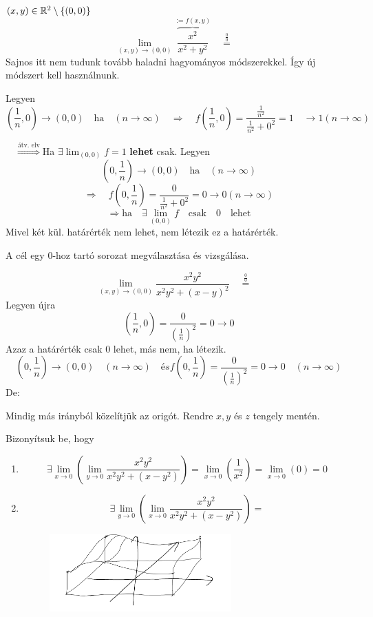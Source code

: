 \documentclass[a4paper,11.5pt]{article}
\begin{document}
	\begin{task}$(x,y)\in\mathbb{R}^2\setminus\{(0,0)\}$
		\[ \lim_{(x,y)\to(0,0)}\overbrace{\frac{x^2}{x^2+y^2}}^{:=f(x,y)}\quad \overset{\frac{0}{0}}{=}\quad  \]
		Sajnos itt nem tudunk tovább haladni hagyományos módszerekkel. Így új módszert kell használnunk.
		\smallskip
		
		Legyen \[\left(\frac{1}{n},0\right)\to(0,0)\quad \text{ha}\quad (n\to\infty)\quad \Rightarrow\quad f\left(\frac{1}{n},0\right)=\frac{\frac{1}{n^2}}{\frac{1}{n^2}+0^2}=1\quad \to1(n\to\infty)\]
		
		$\quad \overset{\text{átv. elv}}{\Rightarrow}$\quad Ha $\exists\lim_{(0,0)}f=1$ \textbf{lehet} csak.
		Legyen 
		\[ \left(0,\frac{1}{n}\right)\to(0,0)\quad \text{ha}\quad (n\to\infty) \]
		\[ \Rightarrow\quad f\left(0,\frac{1}{n}\right)=\frac{0}{\frac{1}{n^2}+0^2}=0\to 0(n\to\infty) \]
		\[ \Rightarrow \text{ha}\quad \exists\lim_{(0,0)}f\quad \text{csak}\quad 0 \quad \text{lehet} \]
		Mivel két kül. határérték nem lehet, nem létezik ez a határérték.
	\end{task}
	\begin{note}
		A cél egy 0-hoz tartó sorozat megválasztása és vizsgálása.
	\end{note}
	\begin{task}
		\[ \lim_{(x,y)\to(0,0)}\frac{x^2y^2}{x^2y^2+(x-y)^2}\quad \overset{\frac{0}{0}}{=}\quad  \]
		Legyen újra
		\[ \left(\frac{1}{n},0\right)=\frac{0}{\left(\frac{1}{n}\right)^2}=0\to0 \]
		Azaz a határérték csak 0 lehet, más nem, ha létezik.
		\[ \left(0,\frac{1}{n}\right)\to(0,0)\quad (n\to\infty)\quad és f\left(0,\frac{1}{n}\right)=\frac{0}{\left(\frac{1}{n}\right)^2}=0\to 0\quad (n\to\infty) \]
		De:
	\end{task}
	\begin{note}
		Mindig más irányból közelítjük az origót. Rendre $x, y$ és $z$ tengely mentén.
	\end{note}
	\begin{task}
		Bizonyítsuk be, hogy
		\begin{enumerate}
			\item \[ \exists\lim_{x\to0}\left(\lim_{y\to0}\frac{x^2y^2}{x^2y^2+(x-y^2)}\right)=\lim_{x\to0}\left(\frac{1}{x^2}\right)=\lim_{x\to0}(0)=0 \]
			\item \[ \exists\lim_{y\to0}\left(\lim_{x\to0}\frac{x^2y^2}{x^2y^2+(x-y^2)}\right)= \]
			\begin{figure}[H]
				\centering
				\includegraphics[height=3cm]{kepek/07.png}
				\caption{}
			\end{figure}
		\end{enumerate}
	\end{task}
\end{document}
